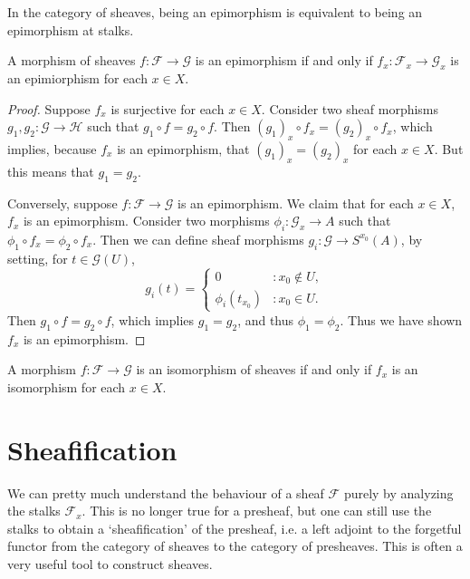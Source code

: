 In the category of sheaves, being an epimorphism is equivalent to being an epimorphism at stalks.

\begin{lemma}
    A morphism of sheaves $f: \mathcal{F} \to \mathcal{G}$ is an epimorphism if and only if $f_x: \mathcal{F}_x \to \mathcal{G}_x$ is an epimiorphism for each $x \in X$. 
\end{lemma}
\begin{proof}
    Suppose $f_x$ is surjective for each $x \in X$. Consider two sheaf morphisms $g_1,g_2: \mathcal{G} \to \mathcal{H}$ such that $g_1 \circ f = g_2 \circ f$. Then $(g_1)_x \circ f_x = (g_2)_x \circ f_x$, which implies, because $f_x$ is an epimorphism, that $(g_1)_x = (g_2)_x$ for each $x \in X$. But this means that $g_1 = g_2$.

    Conversely, suppose $f: \mathcal{F} \to \mathcal{G}$ is an epimorphism. We claim that for each $x \in X$, $f_x$ is an epimorphism. Consider two morphisms $\phi_i: \mathcal{G}_x \to A$ such that $\phi_1 \circ f_x = \phi_2 \circ f_x$. Then we can define sheaf morphisms $g_i: \mathcal{G} \to S^{x_0}(A)$, by setting, for $t \in \mathcal{G}(U)$,
    \[ g_i(t) = \begin{cases} 0 &: x_0 \not \in U, \\ \phi_i(t_{x_0}) &: x_0 \in U. \end{cases} \]
    Then $g_1 \circ f = g_2 \circ f$, which implies $g_1 = g_2$, and thus $\phi_1 = \phi_2$. Thus we have shown $f_x$ is an epimorphism.
\end{proof}

\begin{corollary}
    A morphism $f: \mathcal{F} \to \mathcal{G}$ is an isomorphism of sheaves if and only if $f_x$ is an isomorphism for each $x \in X$.
\end{corollary}

\section{Sheafification}

We can pretty much understand the behaviour of a sheaf $\mathcal{F}$ purely by analyzing the stalks $\mathcal{F}_x$. This is no longer true for a presheaf, but one can still use the stalks to obtain a `sheafification' of the presheaf, i.e. a left adjoint to the forgetful functor from the category of sheaves to the category of presheaves. This is often a very useful tool to construct sheaves.

